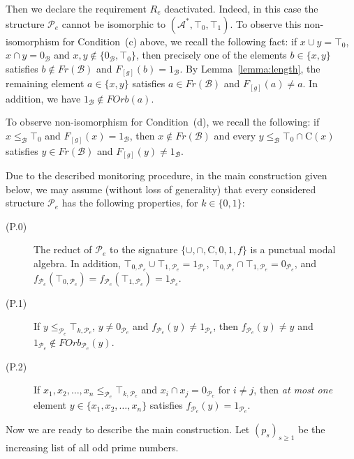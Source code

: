 \documentclass[a4paper,UKenglish,cleveref, autoref, thm-restate]{lipics-v2021}
\begin{document}
Then we declare the requirement $R_e$ deactivated. 
Indeed, in this case the structure $\mathcal{P}_e$ cannot be isomorphic to $(\mathcal{A}^{\ast}, \top_0,\top_1)$. To observe this non-isomorphism for Condition~(c) above, we recall the following fact: if $x\cup y = \top_0$, $x\cap y = 0_{\mathcal{B}}$ and $x,y\not\in \{ 0_{\mathcal{B}}, \top_{0}\}$, then precisely one of the elements $b\in \{x,y\}$ satisfies $b\not\in Fr(\mathcal{B})$ and $F_{[g]}(b) = 1_{\mathcal{B}}$. By Lemma~\ref{lemma:length}, the remaining element $a \in \{ x,y\}$ satisfies $a\in Fr(\mathcal{B})$ and $F_{[g]}(a) \neq a$. In addition, we have $1_{\mathcal{B}} \not\in FOrb(a)$.

To observe non-isomorphism for Condition~(d), we recall the following: if $x\leq_{\mathcal{B}} \top_0$ and $F_{[g]}(x) = 1_{\mathcal{B}}$, then $x\not\in Fr(\mathcal{B})$ and every $y \leq_{\mathcal{B}} \top_0 \cap \mathrm{C}(x)$ satisfies $y\in Fr(\mathcal{B})$ and $F_{[g]}(y)\neq 1_{\mathcal{B}}$.



Due to the described monitoring procedure, in the main construction given below, we may assume (without loss of generality) that every considered structure $\mathcal{P}_e$ has the following properties, for $k\in\{ 0,1\}$:
\begin{description}
	\item[(P.0)] The reduct of $\mathcal{P}_e$ to the signature $\{\cup,\cap,\mathrm{C},0,1,f\}$ is a punctual modal algebra. In addition, $\top_{0,\mathcal{P}_e} \cup \top_{1,\mathcal{P}_e} = 1_{\mathcal{P}_e}$, $\top_{0,\mathcal{P}_e} \cap \top_{1,\mathcal{P}_e} = 0_{\mathcal{P}_e}$, and $f_{\mathcal{P}_e}(\top_{0,\mathcal{P}_e}) = f_{\mathcal{P}_e}(\top_{1,\mathcal{P}_e}) = 1_{\mathcal{P}_e}$.
	
	\item[(P.1)] If $y\leq_{\mathcal{P}_e} \! \top_{k,\mathcal{P}_e}$, $y \neq 0_{\mathcal{P}_e}$ and $f_{\mathcal{P}_e}(y) \neq 1_{\mathcal{P}_e}$, then $f_{\mathcal{P}_e}(y) \neq y$ and $1_{\mathcal{P}_e} \not\in FOrb_{\mathcal{P}_e}(y)$.
	
	\item[(P.2)] If $x_1,x_2,\dots,x_n \leq_{\mathcal{P}_e} \! \top_{k,\mathcal{P}_e}$ and $x_i \cap x_j = 0_{\mathcal{P}_e}$ for $i\neq j$, then \emph{at most one} element $y\in \{ x_1,x_2,\dots,x_n\}$ satisfies $f_{\mathcal{P}_e}(y) = 1_{\mathcal{P}_e}$.
\end{description}
Now we are ready to describe the main construction. Let $(p_s)_{s\geq 1}$ be the increasing list of all odd prime numbers.
\end{document}
